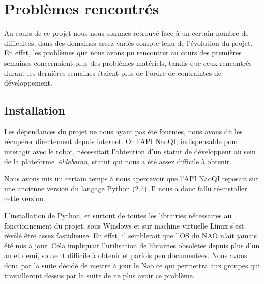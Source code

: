 \section{Problèmes rencontrés}
\label{sec:Problèmes rencontrés}

  \par Au cours de ce projet nous nous sommes retrouvé face à un certain nombre de difficultés, dans des domaines assez variés compte tenu de l'évolution du projet.
  En effet, les problèmes que nous avons pu rencontrer au cours des premières semaines concernaient plus des problèmes matériels,
  tandis que ceux rencontrés durant les dernières semaines étaient plus de l'ordre de contraintes de développement.\\

\subsection{Installation}
\par Les dépendances du projet ne nous ayant pas été fournies, nous avons dû les récupérer directement depuis internet. Or l'API NaoQI, indispensable pour interagir avec le robot, nécessitait l'obtention d'un statut de développeur au sein de la plateforme \textit{Aldebaran}, statut qui nous a été assez difficile à obtenir.
\par Nous avons mis un certain temps à nous apercevoir que l'API NaoQI reposait sur une ancienne version du langage Python (2.7). Il nous a donc fallu ré-installer cette version.
\par L'installation de Python, et surtout de toutes les librairies nécessaires au fonctionnement du projet, sous Windows et sur machine virtuelle Linux s'est révélé être assez fastidieuse. En effet, il semblerait que l'OS du NAO n'ait jamais été mis à jour. Cela impliquait l’utilisation de librairies obsolètes depuis plus d’un an et demi, souvent difficile à obtenir et parfois peu documentées. Nous avons donc par la suite décidé de mettre à jour le Nao ce qui permettra aux groupes qui travailleront dessus par la suite de ne plus avoir ce problème.

